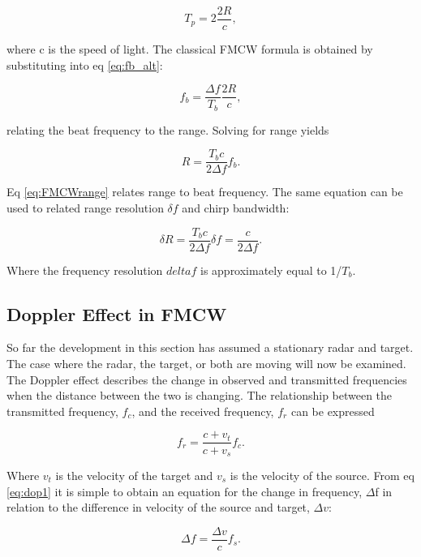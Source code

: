 \begin{equation}
	\label{eq:roundTrip}
	T_p=2\frac{2R}{c},
\end{equation}

where c is the speed of light. The classical FMCW formula is obtained by substituting 
into eq \ref{eq:fb_alt}:

\begin{equation}
	\label{eq:classicFMCW}
	f_b=\frac{\Delta f}{T_b}\frac{2R}{c},
\end{equation}

relating the beat frequency to the range. Solving for range yields

\begin{equation}
\label{eq:FMCWrange}
R=\frac{T_bc}{2\Delta f}f_b.
\end{equation}

Eq \ref{eq:FMCWrange} relates range to beat frequency. The same equation can be used
to related range resolution $\delta$$f$ and chirp bandwidth:

\begin{equation}
	\label{eq:FMCWres}
	\delta R=\frac{T_bc}{2\Delta f}\delta f=\frac{c}{2\Delta f}.
\end{equation}

Where the frequency resolution $delta$$f$ is approximately equal to 1/$T_b$. 

\subsection{Doppler Effect in FMCW}
So far the development in this section has assumed a stationary radar and target. The 
case where the radar, the target, or both are moving will now be examined. The Doppler 
effect describes the change in observed and transmitted frequencies when the distance 
between the two is changing. The relationship between the transmitted frequency, $f_c$, 
and the received frequency, $f_r$ can be expressed

\begin{equation}
	\label{eq:dop1}
	f_r=\frac{c+v_t}{c+v_s}f_c.
\end{equation}

Where $v_t$ is the velocity of the target and $v_s$ is the velocity of the source. From
eq \ref{eq:dop1} it is simple to obtain an equation for the change in frequency, $\Delta$f
in relation to the difference in velocity of the source and target, $\Delta$$v$:

 \begin{equation}
 \label{eq:dop2}
 \Delta f=\frac{\Delta v}{c}f_s.
 \end{equation}
 
